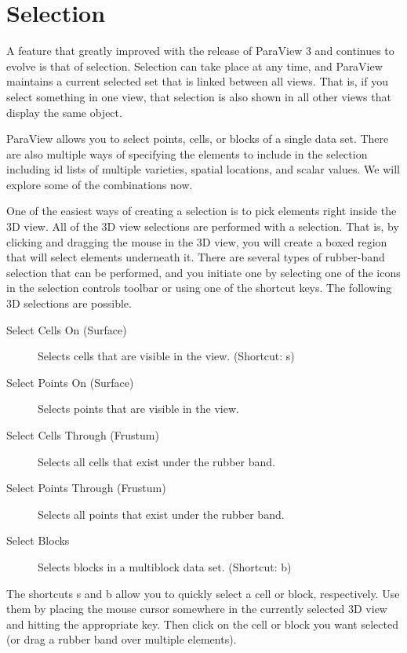 \section{Selection}

A feature that greatly improved with the release of ParaView 3 and
continues to evolve is that of selection.  Selection can take place at any
time, and ParaView maintains a current selected set that is linked between
all views.  That is, if you select something in one view, that selection is
also shown in all other views that display the same object.

ParaView allows you to select points, cells, or blocks of a single data
set.  There are also multiple ways of specifying the elements to include in
the selection including id lists of multiple varieties, spatial locations,
and scalar values.  We will explore some of the combinations now.

One of the easiest ways of creating a selection is to pick elements right
inside the 3D view.  All of the 3D view selections are performed with a
 selection.  That is, by clicking and dragging the
mouse in the 3D view, you will create a boxed region that will select
elements underneath it.  There are several types of rubber-band selection
that can be performed, and you initiate one by selecting one of the icons
in the selection controls toolbar or using one of the shortcut keys.  The
following 3D selections are possible.

\begin{description}
\item[\selectCellsOn Select Cells On (Surface)] Selects cells that are
  visible in the view.  (Shortcut: s)
\item[\selectPointsOn Select Points On (Surface)] Selects points that are
  visible in the view.
\item[\selectCellsThrough Select Cells Through (Frustum)] Selects all cells
  that exist under the rubber band.
\item[\selectPointsThrough Select Points Through (Frustum)] Selects all
  points that exist under the rubber band.
\item[\selectBlocks Select Blocks] Selects blocks in a
  multiblock data set.  (Shortcut: b)
\end{description}

The shortcuts s and b allow you to quickly select a cell or block,
respectively.  Use them by placing the mouse cursor somewhere in the
currently selected 3D view and hitting the appropriate key.  Then click on
the cell or block you want selected (or drag a rubber band over multiple
elements).

